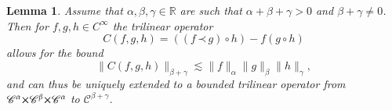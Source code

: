 \documentclass[a4paper,11pt]{article}
\newtheorem{lemma}{Lemma}
{\theorembodyfont{\rmfamily}\newtheorem{remark}{Remark}}
\newcommand{\CC}{\mathscr{C}}
\newcommand{\lpara}{\,\mathord{\prec}\,}
\newcommand{\reso}{\,\mathord{\circ}\,}
\begin{document}
\begin{lemma}
  \label{lemma:commutator}Assume that $\alpha, \beta, \gamma \in \mathbb{R}$
  are such that $\alpha + \beta + \gamma > 0$ and $\beta + \gamma \neq 0$.
  Then for $f, g, h \in C^{\infty}$ the trilinear operator
  \[ C (f, g, h) = ((f \lpara g) \reso h) - f (g \reso h) \]
  allows for the bound
  \begin{equation}
    \label{eq:commutator bound} \|C (f, g, h)\|_{\beta + \gamma} \lesssim
    \|f\|_{\alpha} \|g\|_{\beta} \|h\|_{\gamma},
  \end{equation}
  and can thus be uniquely extended to a bounded trilinear operator from
  $\CC^{\alpha} \hspace{-0.17em} \times \hspace{-0.17em} \CC^{\beta}
  \hspace{-0.17em} \times \hspace{-0.17em} \CC^{\alpha}$ to $\CC^{\beta +
  \gamma}$.
\end{lemma}
\end{document}
